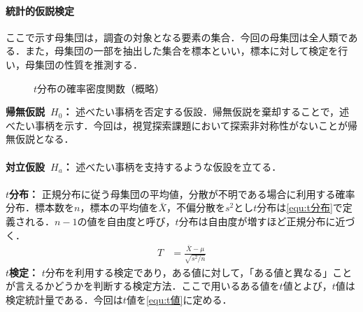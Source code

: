 \paragraph{統計的仮説検定}
ここで示す母集団は，調査の対象となる要素の集合．今回の母集団は全人類である．また，母集団の一部を抽出した集合を標本といい，標本に対して検定を行い，母集団の性質を推測する．
\begin{oframed}
    \begin{figure}
        \centering
        \caption{\(t\)分布の確率密度関数（概略）}
        \vspace{-.5cm}
    \end{figure}
    \noindent\textbf{帰無仮説\ \(H_0\)：} 述べたい事柄を否定する仮設．帰無仮説を棄却することで，述べたい事柄を示す．今回は，視覚探索課題において探索非対称性がないことが帰無仮説となる．\\ \\
    \textbf{対立仮設\ \(H_a\)：} 述べたい事柄を支持するような仮設を立てる．\\ \\
    \textbf{\(t\)分布：} 正規分布に従う母集団の平均値，分散が不明である場合に利用する確率分布．標本数を\(n\)，標本の平均値を\(\bar{X}\)，不偏分散を\(s^2\)とし\(t\)分布は\eqref{equ:t分布}で定義される．\(n-1\)の値を自由度と呼び，\(t\)分布は自由度が増すほど正規分布に近づく\cite[p.178\ -\ p.179]{応用解析と情報数学}．
    \begin{align}
        T & =\frac{\bar{X}-\mu}{\sqrt{s^2/n}}\label{equ:t分布}
    \end{align}
    \textbf{\(t\)検定：} \(t\)分布を利用する検定であり，ある値に対して，「ある値と異なる」ことが言えるかどうかを判断する検定方法．ここで用いるある値を\(t\)値とよび，\(t\)値は検定統計量である．今回は\(t\)値を\eqref{equ:t値}に定める．

\end{oframed}
